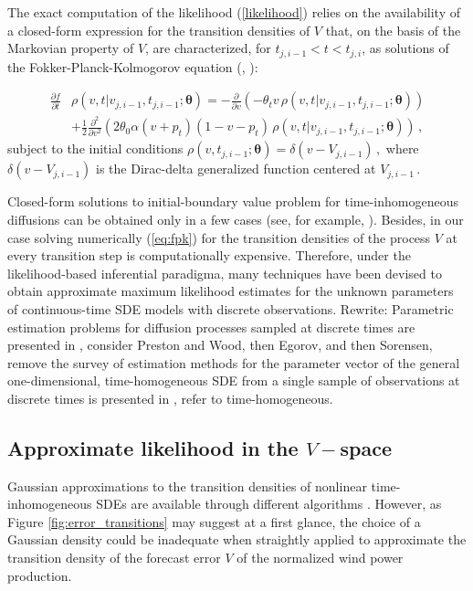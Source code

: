 \documentclass[11pt]{article}
\theoremstyle{definition}
\begin{document}
The exact computation of the likelihood (\ref{likelihood}) relies on the availability of a closed-form expression for the transition densities of $V$ that, on the basis of the Markovian property of $V$, are characterized, for $ t_{j, i-1} < t < t_{j,i}$,  as solutions of the Fokker-Planck-Kolmogorov equation (\cite[36]{iacus1}, \cite[61-68]{saso}):

\begin{align}
\frac{ \partial f }{\partial t } & \rho(v ,t \vert v_{j,i-1} ,  t_{j,i-1} ; \bm{\theta} )= - \frac{\partial}{ \partial v} (- \theta_t v \, \rho(v ,t \vert v_{j,i-1} ,  t_{j,i-1} ; \bm{\theta} ) ) \nonumber \\
& + \frac{1}{2} \frac{\partial^2}{ \partial v^2} ( 2 \theta_0 \alpha (v+ p_t) (1 - v- p_t) \, \rho(v ,t \vert v_{j,i-1} ,  t_{j,i-1} ; \bm{\theta} ) )\,,  \label{eq:fpk}
\end{align}
subject to the initial conditions $\rho(v , t_{j, i-1} ; \bm{\theta} ) = \delta(v - V_{j, i-1}) \,,$ where $ \delta(v - V_{j, i-1})$ is the Dirac-delta generalized function centered at $ V_{j, i-1}\,.$

Closed-form solutions to initial-boundary value problem for time-in\-ho\-mo\-geneous diffusions can be obtained only in a few cases (see, for example, \autocite[Section 3.1]{eglix}). Besides, in our case solving numerically (\ref{eq:fpk}) for the transition densities of the process $V$ at every transition step is computationally expensive. 
Therefore, under the likelihood-based inferential paradigma, many techniques have been devised to obtain approximate maximum likelihood estimates for the unknown parameters of continuous-time SDE models with discrete observations. 
 {\color{red} Rewrite: Parametric estimation problems for diffusion processes sampled at discrete times are presented in \autocite[Chapter 3]{iacus1}, consider Preston and Wood, then Egorov, and then Sorensen, remove the
 survey of estimation methods for the parameter vector of the general one-dimensional, time-homogeneous SDE from a single sample of observations at discrete times is presented in \autocite{hurn}, refer to time-homogeneous.}

\subsection{Approximate likelihood  in the $V-$space}

Gaussian approximations to the transition densities of nonlinear time-in\-ho\-mo\-geneous SDEs are available through different algorithms  \autocite[Chapter 9]{saso}. However, as Figure \ref{fig:error_transitions} may suggest at a first glance, the choice of a Gaussian density could be inadequate when straightly applied to approximate the transition density of the forecast error $V$ of the normalized wind power production. 
\end{document}
